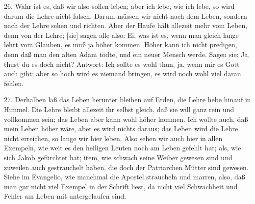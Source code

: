 26. Wahr ist es, daß wir also sollen leben; aber ich lebe, wie ich lebe, so wird darum die Lehre nicht falsch. Darum müssen wir nicht nach dem Leben, sondern nach der Lehre sehen und richten. Aber der Haufe hält allezeit mehr vom Leben, denn von der Lehre; [sie] sagen alle also: Ei, was ist es, wenn man gleich lange lehrt vom Glauben, es muß ja höher kommen. Höher kann ich nicht predigen, denn daß man den alten Adam tödte, und ein neuer Mensch werde. Sagen sie: Ja, thust du es doch nicht? Antwort: Ich sollte es wohl thun, ja, wenn mir es Gott auch gibt; aber so hoch wird es niemand bringen, es wird noch wohl viel daran fehlen.

27. Derhalben laß das Leben herunter bleiben auf Erden, die Lehre hebe hinauf in Himmel. Die Lehre bleibt allezeit ihr selbst gleich, daß sie will ganz rein und vollkommen sein; das Leben aber kann wohl höher kommen. Ich wollte auch, daß mein Leben höher wäre, aber es wird nichts daraus; das Leben wird die Lehre nicht erreichen, so lange wir hier leben. Also sehen wir auch hier in allen Exempeln, wie weit es den heiligen Leuten noch am Leben gefehlt hat; als, wie sich Jakob gefürchtet hat; item, wie schwach seine Weiber gewesen sind und zuweilen auch gestrauchelt haben, die doch der Patriarchen Mütter sind gewesen. Siehe im Evangelio, wie manchmal die Apostel straucheln und marren, also, daß man gar nicht viel Exempel in der Schrift liest, da nicht viel Schwachheit und Fehler am Leben mit untergelaufen sind.

